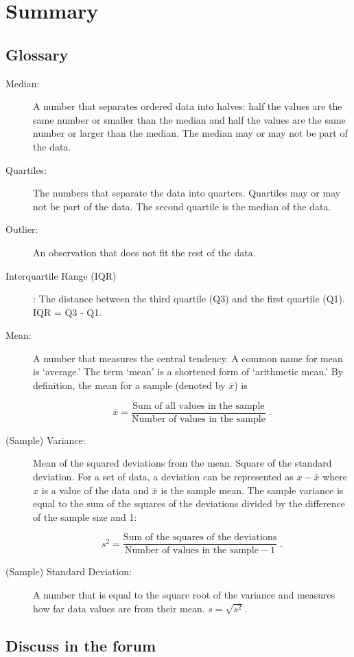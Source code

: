 \documentclass[]{krantz}
\theoremstyle{definition}
\theoremstyle{definition}
\theoremstyle{definition}
\theoremstyle{remark}
\begin{document}
\section{Summary}\label{summary-2}

\subsection*{Glossary}\label{glossary}


\begin{description}
\item[Median:]
A number that separates ordered data into halves: half the values are
the same number or smaller than the median and half the values are the
same number or larger than the median. The median may or may not be part
of the data.
\item[Quartiles:]
The numbers that separate the data into quarters. Quartiles may or may
not be part of the data. The second quartile is the median of the data.
\item[Outlier:]
An observation that does not fit the rest of the data.
\item[Interquartile Range (IQR)]
: The distance between the third quartile (Q3) and the first quartile
(Q1). IQR = Q3 - Q1.
\item[Mean:]
A number that measures the central tendency. A common name for mean is
`average.' The term `mean' is a shortened form of `arithmetic mean.' By
definition, the mean for a sample (denoted by \(\bar x\)) is

\[\bar x = \frac{\mbox{Sum of all values in the sample}}{\mbox{Number of values in the sample}}\;.\]
\item[(Sample) Variance:]
Mean of the squared deviations from the mean. Square of the standard
deviation. For a set of data, a deviation can be represented as
\(x - \bar x\) where \(x\) is a value of the data and \(\bar x\) is the
sample mean. The sample variance is equal to the sum of the squares of
the deviations divided by the difference of the sample size and 1:

\[s^2 = \frac{\mbox{Sum of the squares of the deviations}}{\mbox{Number of values in the sample}-1}\;.\]
\item[(Sample) Standard Deviation:]
A number that is equal to the square root of the variance and measures
how far data values are from their mean. \(s = \sqrt{s^2}\).
\end{description}

\subsection*{Discuss in the forum}\label{discuss-in-the-forum}
\end{document}
